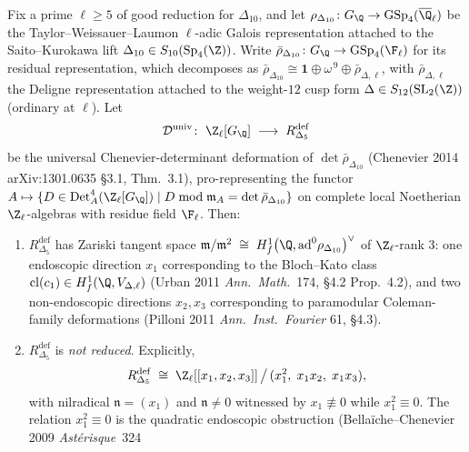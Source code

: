 \begin{theorem}
\label{thm:dl-chenevier-nonreduced-delta5}
\ClaimStatusProvedHere
Fix a prime $\ell \ge 5$ of good reduction for $\Delta_{10}$, and let
$\rho_{\Delta_{10}}\colon G_\Q \to \mathrm{GSp}_4(\overline\Q_\ell)$ be
the Taylor--Weissauer--Laumon $\ell$-adic Galois representation
attached to the Saito--Kurokawa lift
$\Delta_{10} \in S_{10}(\mathrm{Sp}_4(\Z))$. Write
$\bar\rho_{\Delta_{10}}\colon G_\Q \to \mathrm{GSp}_4(\F_\ell)$ for its
residual representation, which decomposes as
$\bar\rho_{\Delta_{10}} \cong \mathbf 1 \oplus \omega^{\,9} \oplus
\bar\rho_{\Delta, \ell}$, with $\bar\rho_{\Delta, \ell}$ the Deligne
representation attached to the weight-$12$ cusp form $\Delta \in
S_{12}(\mathrm{SL}_2(\Z))$ (ordinary at $\ell$). Let
\[
 \mathcal D^{\mathrm{univ}}
 \colon\; \Z_\ell[G_\Q]
 \;\longrightarrow\;
 R^{\mathrm{def}}_{\Delta_5}
\]
be the universal Chenevier-determinant deformation of $\det \bar\rho_{\Delta_{10}}$
(Chenevier 2014 arXiv:1301.0635 \S3.1, Thm.~3.1), pro-representing
the functor
$A \mapsto \{D \in \mathrm{Det}^4_A(\Z_\ell[G_\Q]) \mid D \bmod
\mathfrak m_A = \det\bar\rho_{\Delta_{10}}\}$
on complete local Noetherian $\Z_\ell$-algebras with residue field $\F_\ell$.
Then:
\begin{enumerate}
 \item $R^{\mathrm{def}}_{\Delta_5}$ has Zariski tangent space
 \(
 \mathfrak m / \mathfrak m^2
 \;\cong\;
 H^1_f\bigl(\Q, \mathrm{ad}^0 \rho_{\Delta_{10}}\bigr)^\vee
 \)
 of $\Z_\ell$-rank $3$: one endoscopic direction $x_1$
 corresponding to the Bloch--Kato class
 $\mathrm{cl}(c_1) \in H^1_f(\Q, V_{\Delta, \ell})$
 (Urban 2011 \emph{Ann.\ Math.}\ 174, \S4.2 Prop.~4.2), and two
 non-endoscopic directions $x_2, x_3$ corresponding to paramodular
 Coleman-family deformations (Pilloni 2011 \emph{Ann.\ Inst.\
 Fourier} 61, \S4.3).
 \item $R^{\mathrm{def}}_{\Delta_5}$ is \emph{not reduced}. Explicitly,
 \[
 R^{\mathrm{def}}_{\Delta_5}
 \;\cong\;
 \Z_\ell[[x_1, x_2, x_3]]\,\big/\,(x_1^2,\; x_1 x_2,\; x_1 x_3),
 \]
 with nilradical
 $\mathfrak n = (x_1)$ and $\mathfrak n \ne 0$ witnessed by
 $x_1 \not\equiv 0$ while $x_1^2 \equiv 0$. The relation
 $x_1^2\equiv 0$ is the quadratic endoscopic obstruction
 (Bellaï\-che--Chenevier 2009 \emph{Astérisque}\ 324

\end{enumerate}
\end{theorem}

